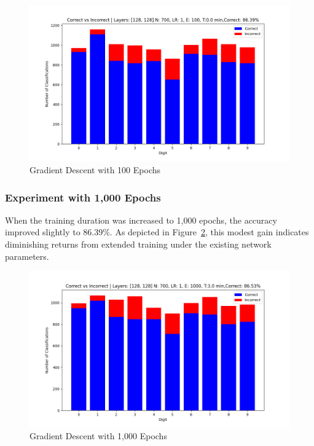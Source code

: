 \documentclass{article}
\begin{document}
\begin{figure}[h!]
    \centering
    \includegraphics[scale=0.5]{../figs/gd_100ep.png}
    \caption{Gradient Descent with 100 Epochs}
    \label{fig:gd_100ep}
\end{figure}

\subsubsection{Experiment with 1,000 Epochs}
When the training duration was increased to 1,000 epochs, the accuracy improved slightly to 86.39\%. As depicted in Figure~\ref{fig:gd_1000ep}, this modest gain indicates diminishing returns from extended training under the existing network parameters.

\begin{figure}[h!]
    \centering
    \includegraphics[scale=0.5]{../figs/gd_1000ep.png}
    \caption{Gradient Descent with 1,000 Epochs}
    \label{fig:gd_1000ep}
\end{figure}
\end{document}
